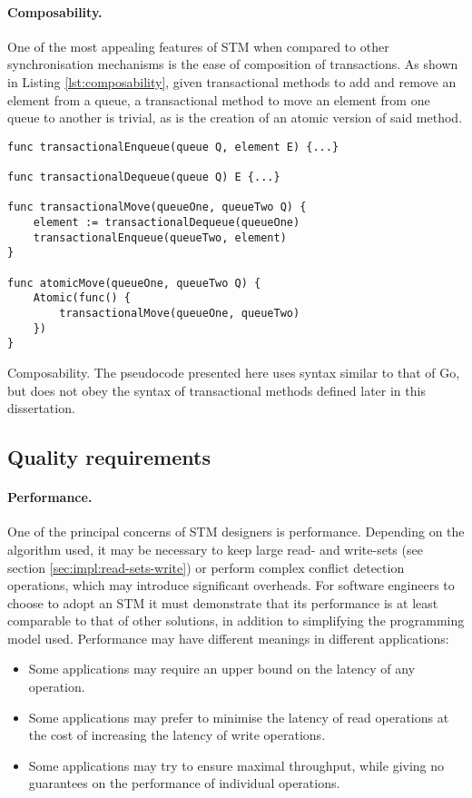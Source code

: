 \documentclass[12pt,a4paper,oneside,openright]{report}
\newcommand{\mycaption}[2]{\caption[#1]{#1 #2}}
\begin{document}
\paragraph{Composability.} One of the most appealing features of STM
when compared to other synchronisation mechanisms is the ease of
composition of transactions. As shown in Listing
\ref{lst:composability}, given transactional methods to add and remove
an element from a queue, a transactional method to move an element
from one queue to another is trivial, as is the creation of an atomic
version of said method.

\begin{Listing}[hbtp]
\begin{lstlisting}
func transactionalEnqueue(queue Q, element E) {...}

func transactionalDequeue(queue Q) E {...}

func transactionalMove(queueOne, queueTwo Q) {
    element := transactionalDequeue(queueOne)
    transactionalEnqueue(queueTwo, element)
}

func atomicMove(queueOne, queueTwo Q) {
    Atomic(func() {
        transactionalMove(queueOne, queueTwo)
    })
}
\end{lstlisting}

  \mycaption{Composability.}{The pseudocode presented here uses syntax
    similar to that of Go, but does not obey the syntax of
    transactional methods defined later in this dissertation.}
  \label{lst:composability}
\end{Listing}


\subsection{Quality requirements}
\label{sec:prep:usab-requ}

\paragraph{Performance.} One of the principal concerns of STM
designers is performance. Depending on the algorithm used, it may be
necessary to keep large read- and write-sets (see section
\ref{sec:impl:read-sets-write}) or perform complex conflict detection
operations, which may introduce significant overheads. For software
engineers to choose to adopt an STM it must demonstrate that its
performance is at least comparable to that of other solutions, in
addition to simplifying the programming model used. Performance may
have different meanings in different applications:
\begin{itemize}
\item Some applications may require an upper bound on the latency of
  any operation.
\item Some applications may prefer to minimise the latency of read
  operations at the cost of increasing the latency of write
  operations.
\item Some applications may try to ensure maximal throughput, while
  giving no guarantees on the performance of individual operations.
\end{itemize}
\end{document}
